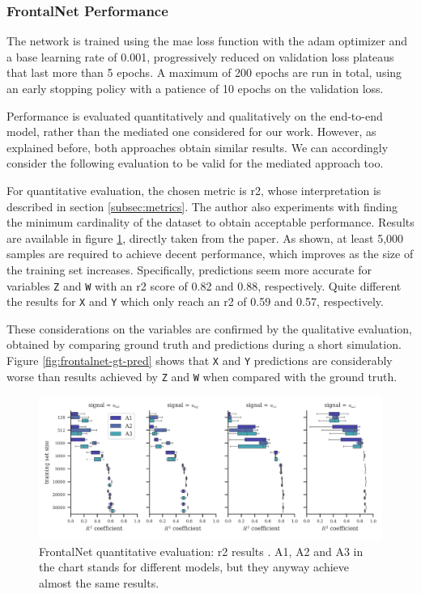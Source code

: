 \subsubsection{FrontalNet Performance}
\label{subsec:frontalnet-performance}


The network is trained using the \gls{mae} loss function with the \gls{adam} optimizer \cite{kingma2014adam} and a base learning rate of 0.001, progressively reduced on validation loss plateaus that last more than 5 epochs. A maximum of 200 epochs are run in total, using an early stopping policy with a patience of 10 epochs on the validation loss. 

Performance is evaluated quantitatively and qualitatively on the end-to-end model, rather than the mediated one considered for our work. However, as explained before, both approaches obtain similar results. We can accordingly consider the following evaluation to be valid for the mediated approach too.

For quantitative evaluation, the chosen metric is \gls{r2}, whose interpretation is described in section \ref{subsec:metrics}. The author also experiments with finding the minimum cardinality of the dataset to obtain acceptable performance. Results are available in figure \ref{fig:frontalnet-r2}, directly taken from the paper. As shown, at least 5,000 samples are required to achieve decent performance, which improves as the size of the training set increases. Specifically, predictions seem more accurate for variables \texttt{Z} and \texttt{W} with an \gls{r2} score of 0.82 and 0.88, respectively. Quite different the results for \texttt{X} and \texttt{Y} which only reach an \gls{r2} of 0.59 and 0.57, respectively.

These considerations on the variables are confirmed by the qualitative evaluation, obtained by comparing ground truth and predictions during a short simulation. Figure \ref{fig:frontalnet-gt-pred} shows that \texttt{X} and \texttt{Y} predictions are considerably worse than results achieved by \texttt{Z} and \texttt{W} when compared with the ground truth.

\begin{figure}[!htb]
	\centering
	\includegraphics[width=1\textwidth]{"contents/images/03-frontalnet-r2"}
	\caption[FrontalNet quantitative evaluation: \gls{r2} results \cite{mantegazza2019visionbased}]{FrontalNet quantitative evaluation: \gls{r2} results \cite{mantegazza2019visionbased}. A1, A2 and A3 in the chart stands for different models, but they anyway achieve almost the same results.}
	\label{fig:frontalnet-r2}
\end{figure}

